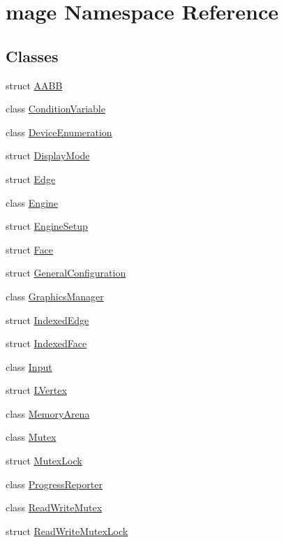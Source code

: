 \hypertarget{namespacemage}{}\section{mage Namespace Reference}
\label{namespacemage}
\subsection*{Classes}
\begin{DoxyCompactItemize}
\item 
struct \hyperlink{structmage_1_1_a_a_b_b}{A\+A\+BB}
\item 
class \hyperlink{classmage_1_1_condition_variable}{Condition\+Variable}
\item 
class \hyperlink{classmage_1_1_device_enumeration}{Device\+Enumeration}
\item 
struct \hyperlink{structmage_1_1_display_mode}{Display\+Mode}
\item 
struct \hyperlink{structmage_1_1_edge}{Edge}
\item 
class \hyperlink{classmage_1_1_engine}{Engine}
\item 
struct \hyperlink{structmage_1_1_engine_setup}{Engine\+Setup}
\item 
struct \hyperlink{structmage_1_1_face}{Face}
\item 
struct \hyperlink{structmage_1_1_general_configuration}{General\+Configuration}
\item 
class \hyperlink{classmage_1_1_graphics_manager}{Graphics\+Manager}
\item 
struct \hyperlink{structmage_1_1_indexed_edge}{Indexed\+Edge}
\item 
struct \hyperlink{structmage_1_1_indexed_face}{Indexed\+Face}
\item 
class \hyperlink{classmage_1_1_input}{Input}
\item 
struct \hyperlink{structmage_1_1_l_vertex}{L\+Vertex}
\item 
class \hyperlink{classmage_1_1_memory_arena}{Memory\+Arena}
\item 
class \hyperlink{classmage_1_1_mutex}{Mutex}
\item 
struct \hyperlink{structmage_1_1_mutex_lock}{Mutex\+Lock}
\item 
class \hyperlink{classmage_1_1_progress_reporter}{Progress\+Reporter}
\item 
class \hyperlink{classmage_1_1_read_write_mutex}{Read\+Write\+Mutex}
\item 
struct \hyperlink{structmage_1_1_read_write_mutex_lock}{Read\+Write\+Mutex\+Lock}

\end{DoxyCompactItemize}

